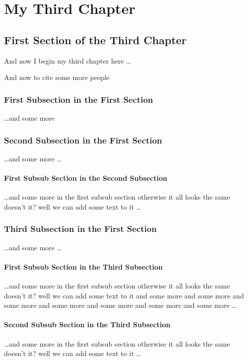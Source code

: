 \chapter{My Third Chapter}

\ifpdf
  \graphicspath{{Chapter5/Figs/Raster/}{Chapter5/Figs/PDF/}{Chapter5/Figs/}}
\else
  \graphicspath{{Chapter5/Figs/Vector/}{Chapter5/Figs/}}
\fi

\section{First Section of the Third Chapter}
And now I begin my third chapter here \dots

And now to cite some more people~\citet{Rea85,Ancey1996}

\subsection{First Subsection in the First Section}
\dots and some more

\subsection{Second Subsection in the First Section}
\dots and some more \dots

\subsubsection{First Subsub Section in the Second Subsection}
\dots and some more in the first subsub section otherwise it all looks the same
doesn't it? well we can add some text to it \dots

\subsection{Third Subsection in the First Section}
\dots and some more \dots

\subsubsection{First Subsub Section in the Third Subsection}
\dots and some more in the first subsub section otherwise it all looks the same
doesn't it? well we can add some text to it and some more and some more and
some more and some more and some more and some more and some more \dots

\subsubsection{Second Subsub Section in the Third Subsection}
\dots and some more in the first subsub section otherwise it all looks the same
doesn't it? well we can add some text to it \dots

